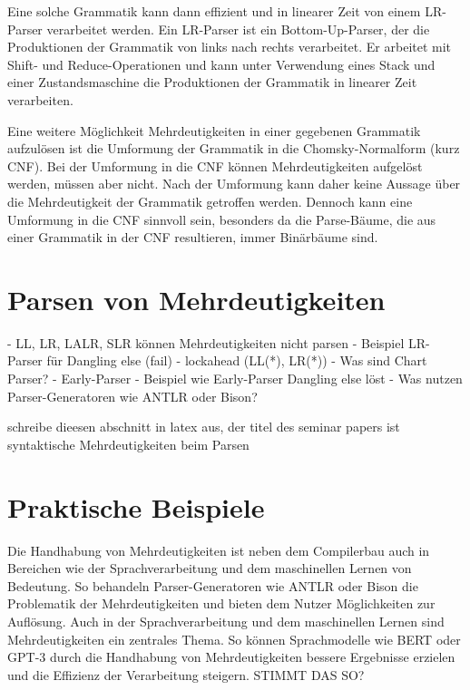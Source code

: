 \documentclass[runningheads]{llncs}
\begin{document}
	Eine solche Grammatik kann dann effizient und in linearer Zeit von einem LR-Parser verarbeitet werden.
	Ein LR-Parser ist ein Bottom-Up-Parser, der die Produktionen der Grammatik von links nach rechts verarbeitet.
	Er arbeitet mit Shift- und Reduce-Operationen und kann unter Verwendung eines Stack und einer Zustandsmaschine
	die Produktionen der Grammatik in linearer Zeit verarbeiten.

	Eine weitere Möglichkeit Mehrdeutigkeiten in einer gegebenen Grammatik aufzulösen
	ist die Umformung der Grammatik in die Chomsky-Normalform (kurz CNF).
	Bei der Umformung in die CNF können Mehrdeutigkeiten aufgelöst werden, müssen aber nicht.
	Nach der Umformung kann daher keine Aussage über die Mehrdeutigkeit der Grammatik getroffen werden.
	Dennoch kann eine Umformung in die CNF sinnvoll sein, besonders da die Parse-Bäume,
	die aus einer Grammatik in der CNF resultieren, immer Binärbäume sind.


	\section{Parsen von Mehrdeutigkeiten}\label{sec:parsen-von-mehrdeutigkeiten}

	- LL, LR, LALR, SLR können Mehrdeutigkeiten nicht parsen
	- Beispiel LR-Parser für Dangling else (fail)
	- lockahead (LL(*), LR(*))
	- Was sind Chart Parser?
	- Early-Parser
	- Beispiel wie Early-Parser Dangling else löst
	- Was nutzen Parser-Generatoren wie ANTLR oder Bison?

	schreibe dieesen abschnitt in latex aus, der titel des seminar papers ist syntaktische Mehrdeutigkeiten beim Parsen


	\section{Praktische Beispiele}\label{sec:praktische-beispiele}

	Die Handhabung von Mehrdeutigkeiten ist neben dem Compilerbau
	auch in Bereichen wie der Sprachverarbeitung und dem maschinellen Lernen von Bedeutung.
	So behandeln Parser-Generatoren wie ANTLR oder Bison die Problematik der Mehrdeutigkeiten
	und bieten dem Nutzer Möglichkeiten zur Auflösung.
	Auch in der Sprachverarbeitung und dem maschinellen Lernen sind Mehrdeutigkeiten ein zentrales Thema.
	So können Sprachmodelle wie BERT oder GPT-3 durch die Handhabung von Mehrdeutigkeiten
	bessere Ergebnisse erzielen und die Effizienz der Verarbeitung steigern.
	STIMMT DAS SO?
\end{document}
